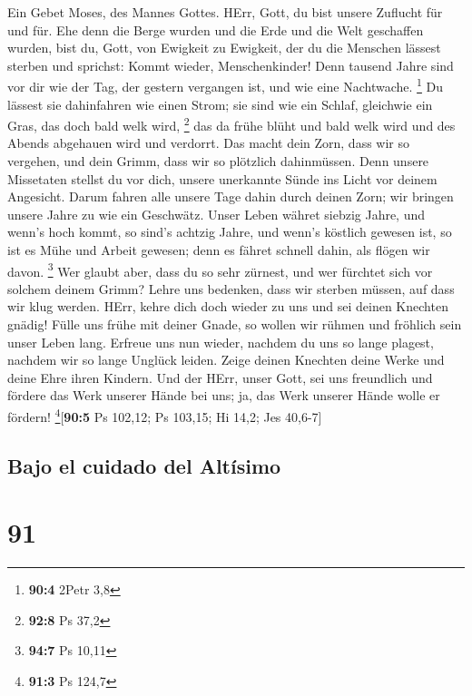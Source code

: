  Ein Gebet Moses, des Mannes Gottes. HErr, Gott, du bist
unsere Zuflucht für und für.  Ehe denn die Berge wurden
und die Erde und die Welt geschaffen wurden, bist du, Gott, von Ewigkeit
zu Ewigkeit,  der du die Menschen lässest sterben und
sprichst: Kommt wieder, Menschenkinder!  Denn tausend
Jahre sind vor dir wie der Tag, der gestern vergangen ist, und wie eine
Nachtwache. \footnote{\textbf{90:4} 2Petr 3,8}  Du lässest
sie dahinfahren wie einen Strom; sie sind wie ein Schlaf, gleichwie ein
Gras, das doch bald welk wird, \footnote{\textbf{92:8} Ps 37,2}
 das da frühe blüht und bald welk wird und des Abends
abgehauen wird und verdorrt.  Das macht dein Zorn, dass
wir so vergehen, und dein Grimm, dass wir so plötzlich dahinmüssen.
 Denn unsere Missetaten stellst du vor dich, unsere
unerkannte Sünde ins Licht vor deinem Angesicht.  Darum
fahren alle unsere Tage dahin durch deinen Zorn; wir bringen unsere
Jahre zu wie ein Geschwätz.  Unser Leben währet siebzig
Jahre, und wenn's hoch kommt, so sind's achtzig Jahre, und wenn's
köstlich gewesen ist, so ist es Mühe und Arbeit gewesen; denn es fähret
schnell dahin, als flögen wir davon. \footnote{\textbf{94:7} Ps 10,11}
 Wer glaubt aber, dass du so sehr zürnest, und wer
fürchtet sich vor solchem deinem Grimm?  Lehre uns
bedenken, dass wir sterben müssen, auf dass wir klug werden.
 HErr, kehre dich doch wieder zu uns und sei deinen
Knechten gnädig!  Fülle uns frühe mit deiner Gnade, so
wollen wir rühmen und fröhlich sein unser Leben lang. 
Erfreue uns nun wieder, nachdem du uns so lange plagest, nachdem wir so
lange Unglück leiden.  Zeige deinen Knechten deine Werke
und deine Ehre ihren Kindern.  Und der HErr, unser Gott,
sei uns freundlich und fördere das Werk unserer Hände bei uns; ja, das
Werk unserer Hände wolle er fördern! \footnote{\textbf{91:3} Ps 124,7}{[}\textbf{90:5}
Ps 102,12; Ps 103,15; Hi 14,2; Jes 40,6-7{]}

\hypertarget{bajo-el-cuidado-del-altuxedsimo}{%
\subsection{Bajo el cuidado del
Altísimo}\label{bajo-el-cuidado-del-altuxedsimo}}

\hypertarget{section-90}{%
\section{91}\label{section-90}}

